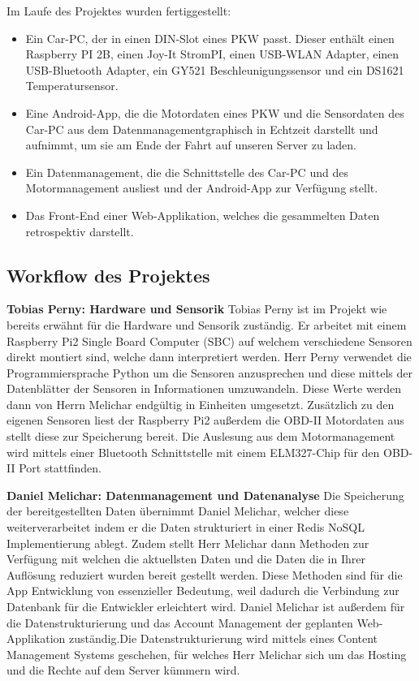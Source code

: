 Im Laufe des Projektes wurden fertiggestellt:
\begin{itemize}
\item Ein Car-PC, der in einen DIN-Slot eines PKW passt. Dieser enthält einen Raspberry PI 2B,
einen Joy-It StromPI,
einen USB-WLAN Adapter,
einen USB-Bluetooth Adapter,
ein GY521 Beschleunigungssensor und
ein DS1621 Temperatursensor.
\item Eine Android-App, die die Motordaten eines PKW und die Sensordaten des Car-PC aus dem Datenmanagementgraphisch in Echtzeit darstellt und aufnimmt, um sie am Ende der Fahrt auf unseren Server zu laden.
\item Ein Datenmanagement, die die Schnittstelle des Car-PC und des Motormanagement ausliest und der Android-App zur Verfügung stellt.
\item Das Front-End einer Web-Applikation, welches die gesammelten Daten retrospektiv darstellt.
\end{itemize}

\subsection{Workflow des Projektes}
	\textbf{Tobias Perny: Hardware und Sensorik\newline}
	Tobias Perny ist im Projekt wie bereits erwähnt für die Hardware und Sensorik zuständig. Er arbeitet mit einem Raspberry Pi2 Single Board Computer (SBC) auf welchem verschiedene Sensoren direkt montiert sind, welche dann interpretiert werden. Herr Perny verwendet die Programmiersprache Python um die Sensoren anzusprechen und diese mittels der Datenblätter der Sensoren in Informationen umzuwandeln. Diese Werte werden dann von Herrn Melichar endgültig in Einheiten umgesetzt.
	Zusätzlich zu den eigenen Sensoren liest der Raspberry Pi2 außerdem die OBD-II Motordaten aus stellt diese zur Speicherung bereit. 
	Die Auslesung aus dem Motormanagement wird mittels einer Bluetooth Schnittstelle mit einem ELM327-Chip für den OBD-II Port stattfinden.

	\textbf{Daniel Melichar: Datenmanagement und Datenanalyse\newline}
	Die Speicherung der bereitgestellten Daten übernimmt Daniel Melichar, welcher diese weiterverarbeitet indem er die Daten strukturiert in einer Redis NoSQL Implementierung ablegt. Zudem stellt Herr Melichar dann Methoden zur Verfügung mit welchen die aktuellsten Daten und die Daten die in Ihrer Auflösung reduziert wurden bereit gestellt werden. Diese Methoden sind für die App Entwicklung von essenzieller Bedeutung, weil dadurch die Verbindung zur Datenbank für die Entwickler erleichtert wird.
	Daniel Melichar ist außerdem für die Datenstrukturierung und das Account Management der geplanten Web-Applikation zuständig.Die Datenstrukturierung wird mittels eines Content Management Systems geschehen, für welches Herr Melichar sich um das Hosting und die Rechte auf dem Server kümmern wird. 

